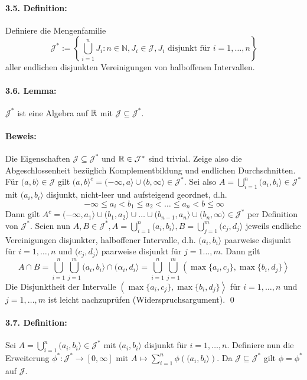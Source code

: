 \paragraph{3.5. Definition:}Definiere die Mengenfamilie
$$\mathcal{J}^*:=\left\{\bigcup_{i=1}^nJ_i:n\in\mathbb{N},J_i\in\mathcal{J},J_i\text{ disjunkt f\"ur }i=1,\hdots,n\right\}$$
aller endlichen disjunkten Vereinigungen von halboffenen Intervallen. 

\paragraph{3.6. Lemma:}$\mathcal{J}^*$ ist eine Algebra auf $\mathbb{R}$ mit $\mathcal{J}\subseteq\mathcal{J}^*$.

\paragraph{Beweis:}Die Eigenschaften $\mathcal{J}\subseteq\mathcal{J}^*$ und $\mathbb{R}\in\mathcal{J}^*$ sind trivial. Zeige also die Abgeschlossenheit bez\"uglich Komplementbildung und endlichen Durchschnitten. \newline\newline
F\"ur $(a,b\rangle\in\mathcal{J}$ gilt $(a,b\rangle^c=(-\infty,a\rangle\cup(b,\infty\rangle\in\mathcal{J}^*$. Sei also $A=\bigcup_{i=1}^n(a_i,b_i\rangle\in\mathcal{J}^*$ mit $(a_i,b_i\rangle$ disjunkt, nicht-leer und aufsteigend geordnet, d.h.
$$-\infty\leq a_i<b_1\leq a_2<\hdots\leq a_n<b\leq\infty$$
Dann gilt $A^c=(-\infty,a_1\rangle\cup(b_1,a_2\rangle\cup\hdots\cup(b_{n-1},a_n\rangle\cup(b_n,\infty\rangle\in\mathcal{J}^*$ per Definition von $\mathcal{J}^*$.\newline\newline
Seien nun $A,B\in\mathcal{J}^*, A=\bigcup_{i=1}^n(a_i,b_i\rangle,B=\bigcup_{j=1}^m(c_j,d_j\rangle$ jeweils endliche Vereinigungen disjunkter, halboffener Intervalle, d.h. $(a_i,b_i\rangle$ paarweise disjunkt f\"ur $i=1,\hdots,n$ und $(c_j,d_j\rangle$ paarweise disjunkt f\"ur $j=1\hdots,m$. Dann gilt
$$A\cap B=\bigcup_{i=1}^n\bigcup_{j=1}^m(a_i,b_i\rangle\cap (\alpha_i,d_i\rangle=\bigcup_{i=1}^n\bigcup_{j=1}^m\left(\max\{a_i,c_j\},\max\{b_i,d_j\}\right\rangle$$
Die Disjunktheit der Intervalle $\left(\max\{a_i,c_j\},\max\{b_i,d_j\}\right\rangle$ f\"ur $i=1,\hdots,n$ und $j=1,\hdots,m$ ist leicht nachzupr\"ufen (Widerspruchsargument). \qed

\paragraph{3.7. Definition:}Sei $A=\bigcup_{i=1}^n(a_i,b_i\rangle\in\mathcal{J}^*$ mit $(a_i,b_i\rangle$ disjunkt f\"ur $i=1,\hdots,n$. Definiere nun die Erweiterung $\phi^*:\mathcal{J}^*\to[0,\infty]$ mit $A\mapsto\sum_{i=1}^n\phi\left((a_i,b_i\rangle\right)$. Da $\mathcal{J}\subseteq\mathcal{J}^*$ gilt $\phi=\phi^*$ auf $\mathcal{J}$.

